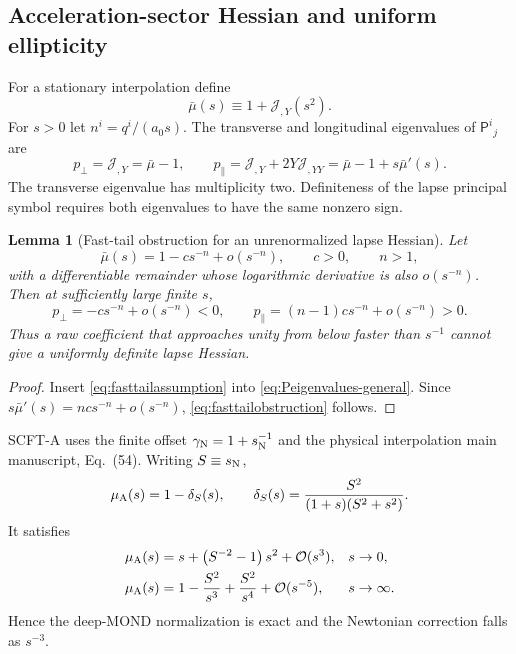\documentclass[aps,prd,reprint,onecolumn,notitlepage,nofootinbib,longbibliography,floatfix]{revtex4-2}
\theoremstyle{scstyle}
\newtheorem{lemma}[theorem]{Lemma}
\theoremstyle{definition}
\theoremstyle{remark}
\newcommand{\cJ}{\mathcal J}
\newcommand{\cO}{\mathcal O}
\begin{document}
\subsection{Acceleration-sector Hessian and uniform ellipticity}
\label{app:JDiracaudit}

For a stationary interpolation define
\begin{equation}
\bar\mu(s)\equiv1+\cJ_{,Y}(s^2).
\label{eq:mubarraw}
\end{equation}
For $s>0$ let $n^i=q^i/(a_0s)$. The transverse and longitudinal eigenvalues of $\mathsf P^i{}_j$ are
\begin{equation}
p_\perp=\cJ_{,Y}=\bar\mu-1,
\qquad
p_\parallel=\cJ_{,Y}+2Y\cJ_{,YY}
=\bar\mu-1+s\bar\mu'(s).
\label{eq:Peigenvalues-general}
\end{equation}
The transverse eigenvalue has multiplicity two. Definiteness of the lapse principal symbol requires both eigenvalues to have the same nonzero sign.

\begin{lemma}[Fast-tail obstruction for an unrenormalized lapse Hessian]
\label{lem:fasttailobstruction}
Let
\begin{equation}
\bar\mu(s)=1-cs^{-n}+o(s^{-n}),
\qquad c>0,
\qquad n>1,
\label{eq:fasttailassumption}
\end{equation}
with a differentiable remainder whose logarithmic derivative is also $o(s^{-n})$. Then at sufficiently large finite $s$,
\begin{equation}
p_\perp=-cs^{-n}+o(s^{-n})<0,
\qquad
p_\parallel=(n-1)cs^{-n}+o(s^{-n})>0.
\label{eq:fasttailobstruction}
\end{equation}
Thus a raw coefficient that approaches unity from below faster than $s^{-1}$ cannot give a uniformly definite lapse Hessian.
\end{lemma}
\begin{proof}
Insert \cref{eq:fasttailassumption} into \cref{eq:Peigenvalues-general}. Since $s\bar\mu'(s)=ncs^{-n}+o(s^{-n})$, \cref{eq:fasttailobstruction} follows.
\end{proof}

SCFT-A uses the finite offset $\gamma_{\rm N}=1+s_{\rm N}^{-1}$ and the physical interpolation main manuscript, Eq.~(54). Writing $S\equiv s_{\rm N}$,
\begin{equation}
\mu_{\rm A}(s)=1-\delta_S(s),
\qquad
\delta_S(s)=\frac{S^2}{(1+s)(S^2+s^2)}.
\label{eq:deltaS}
\end{equation}
It satisfies
\begin{align}
\mu_{\rm A}(s)
&=s+\left(S^{-2}-1\right)s^2+\cO(s^3),
&&s\to0,
\label{eq:newmulow}\\
\mu_{\rm A}(s)
&=1-\frac{S^2}{s^3}+\frac{S^2}{s^4}+\cO(s^{-5}),
&&s\to\infty.
\label{eq:newmuhigh}
\end{align}
Hence the deep-MOND normalization is exact and the Newtonian correction falls as $s^{-3}$.
\end{document}
